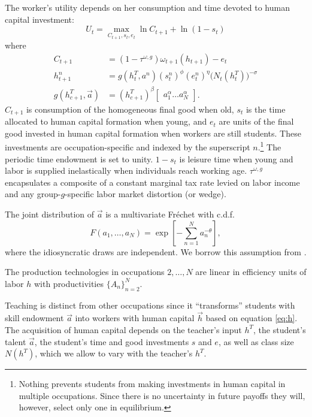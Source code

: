 \documentclass[onehalfspacing,11pt]{article}
\begin{document}
The worker's utility depends on her consumption and time devoted to human capital investment:
\begin{equation}
\label{ }
U_t = \max_{C_{t+1},s_t,e_t}\ln C_{t+1} + \ln\left(1-s_t\right)
\end{equation}
where
\begin{align}
\label{}
C_{t+1} & =(1-\tau^{\omega,g})\omega_{t+1}(h_{t+1})-e_{t} \\ %
h_{t+1}^n & =g(h_{t}^T,a^n)(s_t^n)^{\phi} (e_t^n)^{\eta}\big(N_t(h_t^T)\big)^{-\sigma} \label{eq:h}\\
g(h_{c+1}^T,\vec{a}) & =(h_{c+1}^T)^\beta \begin{bmatrix}a_1^\alpha \ldots a_N^\alpha \end{bmatrix}.
\end{align}
$C_{t+1}$ is consumption of the homogeneous final good when old, $s_t$ is the time allocated to human capital formation when young, and $e_t$ are units of the final good invested in human capital formation when workers are still students. These investments are occupation-specific and indexed by the superscript $n$.\footnote{Nothing prevents students from making investments in human capital in multiple occupations. Since there is no uncertainty in future payoffs they will, however, select only one in equilibrium.} The periodic time endowment is set to unity. $1-s_t$ is leisure time when young and labor is supplied inelastically when individuals reach working age. $\tau^{\omega,g}$ encapsulates a composite of a constant marginal tax rate levied on labor income and any group-$g$-specific labor market distortion (or wedge).

The joint distribution of $\vec{a}$ is a multivariate Fr\'echet with c.d.f.
\begin{equation}
\label{ }
F(a_1,\ldots,a_N) = \exp \left[ -\sum_{n=1}^N a_n^{-\theta} \right],
\end{equation}
where the idiosyncratic draws are independent. We borrow this assumption from \cite{Eaton:2002}.

The production technologies in occupations $2,\ldots,N$ are linear in efficiency units of labor $h$ with productivities $\{A_n\}_{n=2}^N$.

Teaching is distinct from other occupations since it ``transforms'' students with skill endowment $\vec{a}$ into workers with human capital $\vec{h}$ based on equation \eqref{eq:h}. The acquisition of human capital depends on the teacher's input $h^T$, the student's talent $\vec{a}$, the student's time and good investments $s$ and $e$, as well as class size $N(h^T)$, which we allow to vary with the teacher's $h^T$.
\end{document}
